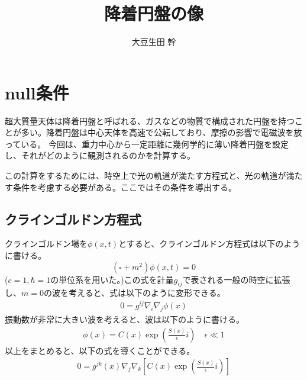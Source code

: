 \documentclass[dvipdfmx]{report} %
\title{降着円盤の像}
\author{大豆生田 幹}
\date{}
\begin{document}
\maketitle %
\tableofcontents %
\fontsize{11pt}{11pt}\selectfont %


\chapter{null条件}
超大質量天体は降着円盤と呼ばれる、ガスなどの物質で構成された円盤を持つことが多い。降着円盤は中心天体を高速で公転しており、摩擦の影響で電磁波を放っている。
今回は、重力中心から一定距離に幾何学的に薄い降着円盤を設定し、それがどのように観測されるのかを計算する。

この計算をするためには、時空上で光の軌道が満たす方程式と、光の軌道が満たす条件を考慮する必要がある。ここではその条件を導出する。
\section{クラインゴルドン方程式}
クラインゴルドン場を$\phi(x, t)$とすると、クラインゴルドン方程式は以下のように書ける。
\[
	\left( \square+m^2 \right) \phi(x, t) = 0
\]
($c=1, \hbar=1$の単位系を用いた。)この式を計量$g_{ij}$で表される一般の時空に拡張し、$m=0$の波を考えると、式は以下のように変形できる。
\begin{equation}
\begin{split}
	0 = g^{ij}\nabla_{i}\nabla_{j}\phi(x)
\end{split}
\end{equation}
振動数が非常に大きい波を考えると、波は以下のように書ける。
\begin{equation}
\begin{split}
	\phi(x) = C(x)\exp{ \left( \frac{S(x)}{\epsilon}i \right) } \quad \epsilon \ll 1
\end{split}
\end{equation}
以上をまとめると、以下の式を導くことができる。
\begin{equation*}
\begin{split}
	0 = g^{jk}(x)\nabla_{j}\nabla_{k}
		\left[ C(x)\exp{ \left( \frac{S(x)}{\epsilon}i \right) } \right]
\end{split}
\end{equation*}
\end{document}
